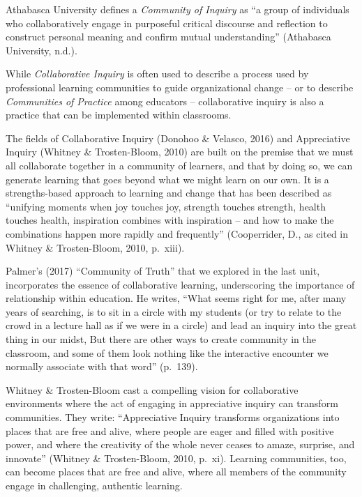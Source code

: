 \documentclass[
]{book}
\begin{document}
Athabasca University defines a \emph{Community of Inquiry} as ``a group of individuals who collaboratively engage in purposeful critical discourse and reflection to construct personal meaning and confirm mutual understanding'' (Athabasca University, n.d.).

While \emph{Collaborative Inquiry} is often used to describe a process used by professional learning communities to guide organizational change -- or to describe \emph{Communities of Practice} among educators -- collaborative inquiry is also a practice that can be implemented within classrooms.

The fields of Collaborative Inquiry (Donohoo \& Velasco, 2016) and Appreciative Inquiry (Whitney \& Trosten-Bloom, 2010) are built on the premise that we must all collaborate together in a community of learners, and that by doing so, we can generate learning that goes beyond what we might learn on our own. It is a strengths-based approach to learning and change that has been described as ``unifying moments when joy touches joy, strength touches strength, health touches health, inspiration combines with inspiration -- and how to make the combinations happen more rapidly and frequently'' (Cooperrider, D., as cited in Whitney \& Trosten-Bloom, 2010, p.~xiii).

Palmer's (2017) ``Community of Truth'' that we explored in the last unit, incorporates the essence of collaborative learning, underscoring the importance of relationship within education. He writes, ``What seems right for me, after many years of searching, is to sit in a circle with my students (or try to relate to the crowd in a lecture hall as if we were in a circle) and lead an inquiry into the great thing in our midst, But there are other ways to create community in the classroom, and some of them look nothing like the interactive encounter we normally associate with that word'' (p.~139).

Whitney \& Trosten-Bloom cast a compelling vision for collaborative environments where the act of engaging in appreciative inquiry can transform communities. They write: ``Appreciative Inquiry transforms organizations into places that are free and alive, where people are eager and filled with positive power, and where the creativity of the whole never ceases to amaze, surprise, and innovate'' (Whitney \& Trosten-Bloom, 2010, p.~xi). Learning communities, too, can become places that are free and alive, where all members of the community engage in challenging, authentic learning.
\end{document}
